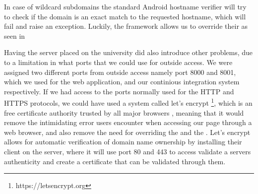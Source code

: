 In case of wildcard subdomains the standard Android hostname verifier will try to check if the domain is an exact match to the requested hostname, which will fail and raise an exception. Luckily, the framework allows us to override their  as seen in 


Having the server placed on the university did also introduce other problems, due to a limitation in what ports that we could use for outside access. 
We were assigned two different ports from outside access namely port 8000 and 8001, which we used for the web application, and our continious integration system respectively. 
If we had access to the ports normally used for the HTTP and HTTPS protocols, we could have used a system called let's encrypt \footnote{https://letsencrypt.org}, which is an free certificate authority trusted by all major browsers \parencite{lets_encrypt_all_browsers}, meaning that it would remove the intimidating error users encounter when accessing our page through a web browser, and also remove the need for overriding the  and the . 
Let's encrypt allows for automatic verification of domain name ownership by installing their client on the server, where it will use port 80 and 443 to access validate a servers authenticity and create a certificate that can be validated through them. 
